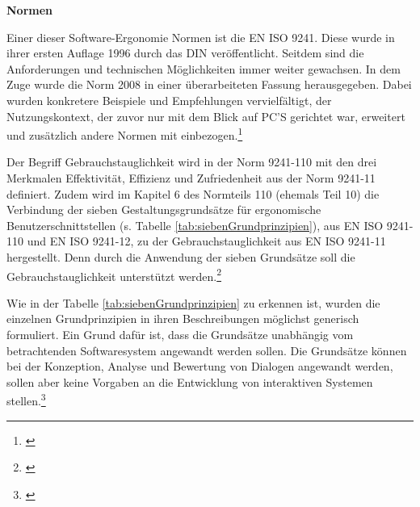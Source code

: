 \textbf{Normen}

Einer dieser Software-Ergonomie Normen ist die \gls{EN} \gls{ISO} 9241. Diese wurde in ihrer ersten Auflage 1996 durch das \gls{DIN} veröffentlicht. Seitdem sind die Anforderungen und technischen Möglichkeiten immer weiter gewachsen. In dem Zuge wurde die Norm 2008 in einer überarbeiteten Fassung herausgegeben. Dabei wurden konkretere Beispiele und Empfehlungen vervielfältigt, der Nutzungskontext, der zuvor nur mit dem Blick auf PC'S gerichtet war, erweitert und zusätzlich andere Normen mit einbezogen.\footnote{\cite[vgl.][]{Schneider2008}}

Der Begriff Gebrauchstauglichkeit wird in der Norm 9241-110 mit den drei Merkmalen Effektivität, Effizienz und Zufriedenheit aus der Norm 9241-11 definiert. Zudem wird im Kapitel 6 des Normteils 110 (ehemals Teil 10) die Verbindung der sieben Gestaltungsgrundsätze für ergonomische Benutzerschnittstellen (s. Tabelle \ref{tab:siebenGrundprinzipien}), aus EN ISO 9241-110 und EN ISO 9241-12, zu der Gebrauchstauglichkeit aus EN ISO 9241-11 hergestellt. Denn durch die Anwendung der sieben Grundsätze soll die Gebrauchstauglichkeit unterstützt werden.\footnote{\cite[vgl.][Kap. 6]{ISO9241-110}}

Wie in der Tabelle \ref{tab:siebenGrundprinzipien} zu erkennen ist, wurden die einzelnen Grundprinzipien in ihren Beschreibungen möglichst generisch formuliert. Ein Grund dafür ist, dass die Grundsätze unabhängig vom betrachtenden Softwaresystem angewandt werden sollen. Die Grundsätze können bei der Konzeption, Analyse und Bewertung von Dialogen angewandt werden, sollen aber keine Vorgaben an die Entwicklung von interaktiven Systemen stellen.\footnote{\cite[vgl.][Kap. 4.1]{ISO9241-110}}

